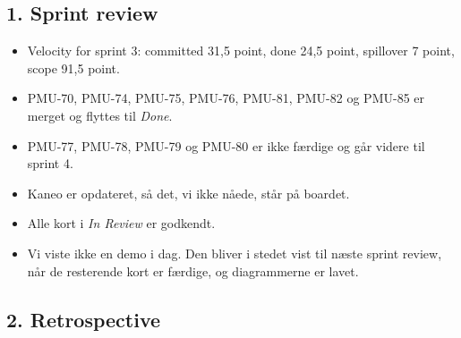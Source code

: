 \documentclass[a4paper,11pt]{article}
\begin{document}
\subsection*{1. Sprint review}

\begin{itemize}
    \item Velocity for sprint 3: committed 31,5 point, done 24,5 point, spillover 7 point, scope 91,5 point.
    \item PMU-70, PMU-74, PMU-75, PMU-76, PMU-81, PMU-82 og PMU-85 er merget og flyttes til \emph{Done}.
    \item PMU-77, PMU-78, PMU-79 og PMU-80 er ikke færdige og går videre til sprint 4.
    \item Kaneo er opdateret, så det, vi ikke nåede, står på boardet.
    \item Alle kort i \emph{In Review} er godkendt.
    \item Vi viste ikke en demo i dag. Den bliver i stedet vist til næste sprint review, når de resterende kort er færdige, og diagrammerne er lavet.
\end{itemize}

\subsection*{2. Retrospective}
\end{document}
